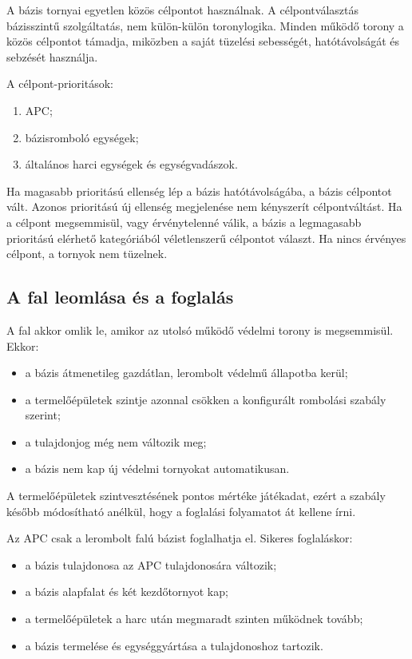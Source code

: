 \documentclass[12pt,a4paper]{article}
\begin{document}
A bázis tornyai egyetlen közös célpontot használnak. A célpontválasztás bázisszintű szolgáltatás, nem külön-külön toronylogika. Minden működő torony a közös célpontot támadja, miközben a saját tüzelési sebességét, hatótávolságát és sebzését használja.

A célpont-prioritások:
\begin{enumerate}
  \item APC;
  \item bázisromboló egységek;
  \item általános harci egységek és egységvadászok.
\end{enumerate}

Ha magasabb prioritású ellenség lép a bázis hatótávolságába, a bázis célpontot vált. Azonos prioritású új ellenség megjelenése nem kényszerít célpontváltást. Ha a célpont megsemmisül, vagy érvénytelenné válik, a bázis a legmagasabb prioritású elérhető kategóriából véletlenszerű célpontot választ. Ha nincs érvényes célpont, a tornyok nem tüzelnek.

\subsection{A fal leomlása és a foglalás}

A fal akkor omlik le, amikor az utolsó működő védelmi torony is megsemmisül. Ekkor:
\begin{itemize}
  \item a bázis átmenetileg gazdátlan, lerombolt védelmű állapotba kerül;
  \item a termelőépületek szintje azonnal csökken a konfigurált rombolási szabály szerint;
  \item a tulajdonjog még nem változik meg;
  \item a bázis nem kap új védelmi tornyokat automatikusan.
\end{itemize}

A termelőépületek szintvesztésének pontos mértéke játékadat, ezért a szabály később módosítható anélkül, hogy a foglalási folyamatot át kellene írni.

Az APC csak a lerombolt falú bázist foglalhatja el. Sikeres foglaláskor:
\begin{itemize}
  \item a bázis tulajdonosa az APC tulajdonosára változik;
  \item a bázis alapfalat és két kezdőtornyot kap;
  \item a termelőépületek a harc után megmaradt szinten működnek tovább;
  \item a bázis termelése és egységgyártása a tulajdonoshoz tartozik.
\end{itemize}
\end{document}
